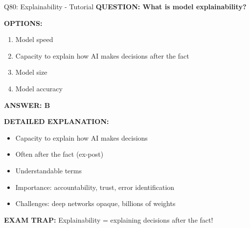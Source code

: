 \documentclass[8pt]{beamer}
\begin{document}
	\begin{frame}{Q80: Explainability - Tutorial}
		\fontsize{6.5}{7.5}\selectfont
		\textbf{QUESTION: What is model explainability?}
		
		\vspace{0.1cm}
		\textbf{OPTIONS:}
		\begin{enumerate}
			\item Model speed
			\item Capacity to explain how AI makes decisions after the fact
			\item Model size
			\item Model accuracy
		\end{enumerate}
		
		\vspace{0.1cm}
		\textcolor{myblue}{\textbf{ANSWER: B}}
		
		\vspace{0.1cm}
		\textbf{DETAILED EXPLANATION:}
		\begin{itemize}
			\item Capacity to explain how AI makes decisions
			\item Often after the fact (ex-post)
			\item Understandable terms
			\item Importance: accountability, trust, error identification
			\item Challenges: deep networks opaque, billions of weights
		\end{itemize}
		
		\vspace{0.1cm}
		\textcolor{myred}{\textbf{EXAM TRAP:}} Explainability = \textcolor{myblue}{explaining decisions after the fact}!
	\end{frame}
	
\end{document}
